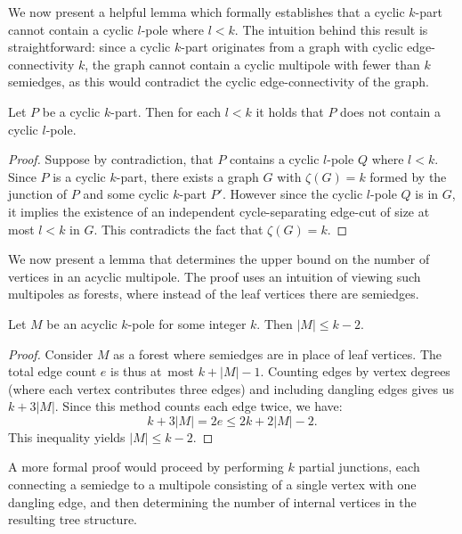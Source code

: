 \documentclass[12pt, twoside]{book}
\begin{document}
We now present a helpful lemma which formally establishes that a cyclic $k$-part cannot contain a cyclic $l$-pole where $l<k$. The intuition behind this result is straightforward: since a cyclic $k$-part originates from a graph with cyclic edge-connectivity $k$, the graph cannot contain a cyclic multipole with fewer than $k$ semiedges, as this would contradict the cyclic edge-connectivity of the graph.

\begin{lemma}\label{lem:cyclic-part-no-small-cyclic-l-pole}
	Let $P$ be a cyclic $k$-part. Then for each $l<k$ it holds that $P$ does not contain a cyclic $l$-pole.
\end{lemma}

\begin{proof}
	Suppose by contradiction, that $P$ contains a cyclic $l$-pole $Q$ where $l<k$. Since $P$ is a cyclic $k$-part, there exists a graph $G$ with $\zeta(G)=k$ formed by the junction of $P$ and some cyclic $k$-part $P'$. However since the cyclic $l$-pole $Q$ is in $G$, it implies the existence of an independent cycle-separating edge-cut of size at most $l<k$ in $G$. This contradicts the fact that $\zeta(G)=k$.
\end{proof}

We now present a lemma that determines the upper bound on the number of vertices in an acyclic multipole. The proof uses an intuition of viewing such multipoles as forests, where instead of the leaf vertices there are semiedges.

\begin{lemma}\label{lem:number-of-vertices-in-acyclic-k-pole}
	Let $M$ be an acyclic $k$-pole for some integer $k$. Then $|M|\leq k-2$. 
\end{lemma}

\begin{proof}
	Consider $M$ as a forest where semiedges are in place of leaf vertices. The total edge count $e$ is thus at~most $k+|M|-1$. Counting edges by vertex degrees (where each vertex contributes three edges) and including dangling edges gives us $k+3|M|$. Since this method counts each edge twice, we have:
	$$k+3|M|=2e\leq 2k+2|M|-2.$$
	This inequality yields $|M|\leq k-2$.
\end{proof}

A more formal proof would proceed by performing $k$ partial junctions, each connecting a semiedge to a multipole consisting of a single vertex with one dangling edge, and then determining the number of internal vertices in the resulting tree structure.
\end{document}
